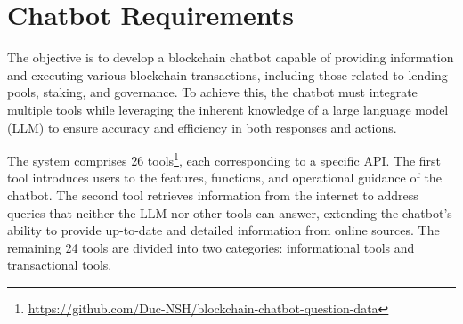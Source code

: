 \documentclass[runningheads]{llncs}
\begin{document}
\section {Chatbot Requirements}
\label{sec:chatbot_requirement}
The objective is to develop a blockchain chatbot capable of providing information and executing various blockchain transactions, including those related to lending pools, staking, and governance. To achieve this, the chatbot must integrate multiple tools while leveraging the inherent knowledge of a large language model (LLM) to ensure accuracy and efficiency in both responses and actions.



The system comprises 26 tools\footnote{\url{https://github.com/Duc-NSH/blockchain-chatbot-question-data}}, each corresponding to a specific API. The first tool introduces users to the features, functions, and operational guidance of the chatbot. The second tool retrieves information from the internet to address queries that neither the LLM nor other tools can answer, extending the chatbot's ability to provide up-to-date and detailed information from online sources. The remaining 24 tools are divided into two categories: informational tools and transactional tools.

\end{document}
